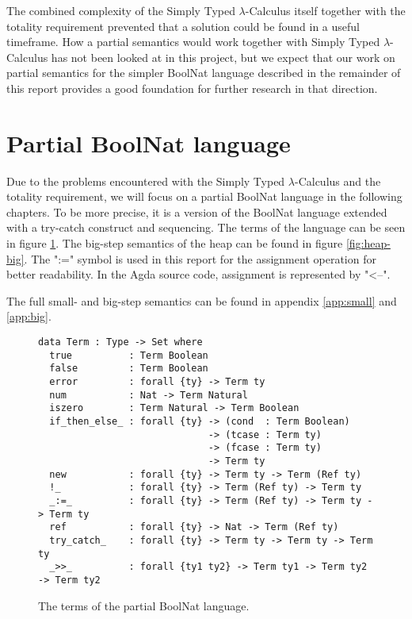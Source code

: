 \documentclass[12pt, a4paper, oneside]{article}
\begin{document}
The combined complexity of the Simply Typed $\lambda$-Calculus itself together with the totality requirement prevented that a solution could be found in a useful timeframe.
How a partial semantics would work together with Simply Typed $\lambda$-Calculus has not been looked at in this project, but we expect
that our work on partial semantics for the simpler BoolNat language described in the remainder of this report provides a good
foundation for further research in that direction.



\section{Partial BoolNat language}
\label{sec:boolnat}
Due to the problems encountered with the Simply Typed $\lambda$-Calculus and the totality requirement, we will focus on a partial BoolNat
language in the following chapters. To be more precise, it is a version of the BoolNat language extended with a try-catch construct and 
sequencing. The terms of the language can be seen in figure \ref{lst:part-boolnat-term}.
The big-step semantics of the heap can be found in figure \ref{fig:heap-big}. The ":=" symbol is used in this report for the assignment
operation for better readability. In the
Agda source code, assignment is represented by "\textless--".

The full small- and big-step semantics can be found in appendix \ref{app:small} and \ref{app:big}.

\begin{figure}
{\scriptsize
\begin{lstlisting}
data Term : Type -> Set where
  true          : Term Boolean
  false         : Term Boolean
  error         : forall {ty} -> Term ty 
  num           : Nat -> Term Natural
  iszero        : Term Natural -> Term Boolean
  if_then_else_ : forall {ty} -> (cond  : Term Boolean)
                              -> (tcase : Term ty)
                              -> (fcase : Term ty)
                              -> Term ty
  new           : forall {ty} -> Term ty -> Term (Ref ty)
  !_            : forall {ty} -> Term (Ref ty) -> Term ty
  _:=_          : forall {ty} -> Term (Ref ty) -> Term ty -> Term ty
  ref           : forall {ty} -> Nat -> Term (Ref ty)
  try_catch_    : forall {ty} -> Term ty -> Term ty -> Term ty
  _>>_          : forall {ty1 ty2} -> Term ty1 -> Term ty2 -> Term ty2
\end{lstlisting}}
\caption{The terms of the partial BoolNat language.}
\label{lst:part-boolnat-term}
\end{figure}
\end{document}
